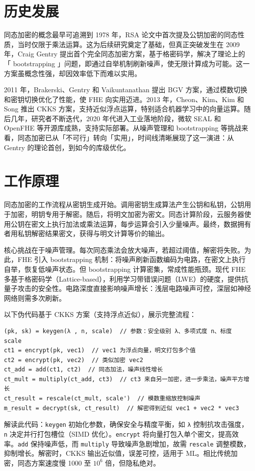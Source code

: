 \chapter{历史发展}
同态加密的概念最早可追溯到 1978 年，RSA 论文中首次提及公钥加密的同态性质，当时仅限于乘法运算。这为后续研究奠定了基础，但真正突破发生在 2009 年，Craig Gentry 提出首个完全同态加密方案，基于格密码学，解决了理论上的「 bootstrapping 」问题，即通过自举机制刷新噪声，使无限计算成为可能。这一方案虽概念性强，却因效率低下而难以实用。\par
2011 年，Brakerski、Gentry 和 Vaikuntanathan 提出 BGV 方案，通过模数切换和密钥切换优化了性能，使 FHE 向实用迈进。2013 年，Cheon、Kim、Kim 和 Song 推出 CKKS 方案，支持近似浮点运算，特别适合机器学习中的向量运算。随后几年，研究者不断迭代，2020 年代进入工业落地阶段，微软 SEAL 和 OpenFHE 等开源库成熟，支持实际部署。从噪声管理和 bootstrapping 等挑战来看，同态加密已从「不可行」转向「实用」，时间线清晰展现了这一演进：从 Gentry 的理论首创，到如今的库级优化。\par
\chapter{工作原理}
同态加密的工作流程从密钥生成开始。调用密钥生成算法产生公钥和私钥，公钥用于加密，明钥专用于解密。随后，将明文加密为密文。同态计算阶段，云服务器使用公钥在密文上执行加法或乘法运算，每步运算会引入少量噪声。最终，数据拥有者用私钥解密结果密文，获得与明文计算等价的输出。\par
核心挑战在于噪声管理。每次同态乘法会放大噪声，若超过阈值，解密将失败。为此，FHE 引入 bootstrapping 机制：将噪声刷新函数编码为电路，在密文上执行自举，恢复低噪声状态。但 bootstrapping 计算密集，常成性能瓶颈。现代 FHE 多基于格密码学（Lattice-based），利用学习带错误问题（LWE）的硬度，提供抗量子攻击的安全性。电路深度直接影响噪声增长：浅层电路噪声可控，深层如神经网络则需多次刷新。\par
以下伪代码基于 CKKS 方案（支持浮点近似），展示完整流程：\par
\begin{lstlisting}
(pk, sk) = keygen(λ , n, scale)  // 参数：安全级别 λ、多项式度 n、标度 scale
ct1 = encrypt(pk, vec1)  // vec1 为浮点向量，明文打包多个值
ct2 = encrypt(pk, vec2)  // 类似加密 vec2
ct_add = add(ct1, ct2)  // 同态加法，噪声线性增长
ct_mult = multiply(ct_add, ct3)  // ct3 来自另一加密，进一步乘法，噪声平方增长
ct_result = rescale(ct_mult, scale')  // 模数重缩放控制噪声
m_result = decrypt(sk, ct_result)  // 解密得到近似 vec1 + vec2 * vec3
\end{lstlisting}
解读此代码：\texttt{keygen} 初始化参数，确保安全与精度平衡，如 \texttt{λ} 控制抗攻击强度，\texttt{n} 决定并行打包槽位（SIMD 优化）。\texttt{encrypt} 将向量打包入单个密文，提高效率。\texttt{add} 保持噪声低，而 \texttt{multiply} 导致噪声急剧增加，故需 \texttt{rescale} 调整模数，抑制增长。解密时，CKKS 输出近似值，误差可控，适用于 ML。相比传统加密，同态方案速度慢 1000 至 $10^6$ 倍，但隐私绝对。\par
